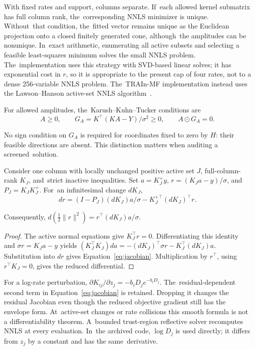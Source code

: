 \documentclass[mathematics,article,accept,moreauthors]{Definitions/mdpi}
\begin{document}
With fixed rates and support, columns separate. If~each allowed kernel submatrix has full column rank, the~corresponding NNLS minimizer is unique. Without~that condition, the~fitted vector remains unique as the Euclidean projection onto a closed finitely generated cone, although~the amplitudes can be nonunique. In~exact arithmetic, enumerating all active subsets and selecting a feasible least-squares minimum solves the small NNLS problem. The~implementation uses this strategy with SVD-based linear solves; it has exponential cost in $r$, so it is appropriate to the present cap of four rates, not to a dense 256-variable NNLS problem. The~TRAIn-MF implementation instead uses the Lawson--Hanson active-set NNLS algorithm~\cite{lawson}.

For allowed amplitudes, the~Karush--Kuhn--Tucker conditions are
\begin{equation}\label{eq:kkt}
 A\geq0,\qquad G_A=K^\top(KA-Y)/\sigma^2\geq0,\qquad A\odot G_A=0.
\end{equation}

No sign condition on $G_A$ is required for coordinates fixed to zero by $H$: their feasible directions are absent. This distinction matters when auditing a screened~solution.

\begin{Proposition}\label{prop:derivative}
Consider one column with locally unchanged positive active set $J$, full-column-rank $K_J$, and~strict inactive inequalities. Set $a=K_J^+y$, $r=(K_Ja-y)/\sigma$, and~$P_J=K_JK_J^+$. For~an infinitesimal change $dK_J$,
\begin{equation}\label{eq:jacobian}
 dr=(I-P_J)(dK_J)a/\sigma-K_J^{+\top}(dK_J)^\top r.
\end{equation}

Consequently, $d(\tfrac12\|r\|^2)=r^\top(dK_J)a/\sigma$.
\end{Proposition}
\begin{proof}
The active normal equations give $K_J^\top r=0$. Differentiating this identity and $\sigma r=K_Ja-y$ yields
$(K_J^\top K_J)da=-(dK_J)^\top\sigma r-K_J^\top(dK_J)a$.
Substitution into $dr$ gives Equation~\eqref{eq:jacobian}. Multiplication by $r^\top$, using $r^\top K_J=0$, gives the reduced differential.
\end{proof}

For a log-rate perturbation, $\partial K_{ij}/\partial z_j=-b_iD_j e^{-b_iD_j}$. The~residual-dependent second term in Equation~\eqref{eq:jacobian} is retained. Dropping it changes the residual Jacobian even though the reduced objective gradient still has the envelope form. At~active-set changes or rate collisions this smooth formula is not a differentiability theorem. A~bounded trust-region reflective solver recomputes NNLS at every evaluation. In~the archived code, $\log D_j$ is used directly; it differs from $z_j$ by a constant and has the same~derivative.
\end{document}
